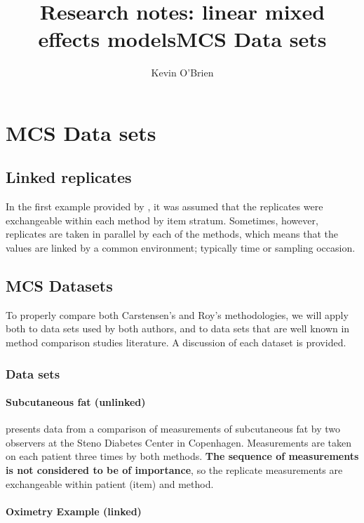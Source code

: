 \documentclass[12pt, a4paper]{report}
\title{Research notes: linear mixed effects models}
\author{ } \date{ }
\theoremstyle{plain}
\theoremstyle{definition}
\theoremstyle{remark}
\begin{document}
\author{Kevin O'Brien}
\title{MCS Data sets}


\newpage
\chapter{MCS Data sets}

\section{Linked replicates }
In the first example provided by \citet{bxc2008}, it was assumed
that the replicates were exchangeable within each method by item
stratum. Sometimes, however, replicates are taken in parallel by
each of the methods, which means that the values are linked by a
common environment; typically time or sampling occasion.

\section{MCS Datasets}

To properly compare both Carstensen's and Roy's methodologies, we
will apply both to data sets used by both authors, and to data
sets that are well known in method comparison studies literature.
A discussion of each dataset is provided.

\subsection{Data sets}

\subsubsection{Subcutaneous fat (unlinked)} \citet{bxc2008} presents data from
a comparison of measurements of subcutaneous fat by two observers
at the Steno Diabetes Center in Copenhagen. Measurements are taken
on each patient three times by both methods. \textbf{The sequence
of measurements is not considered to be of importance}, so the
replicate measurements are exchangeable within patient (item) and
method.

\subsubsection{Oximetry Example (linked)}
\end{document}

